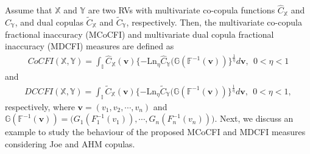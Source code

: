 \documentclass[12pt, a4paper]{article}
\numberwithin{equation}{section}
\begin{document}
Assume that $\mathbb{X}$ and $\mathbb{Y}$ are two RVs with multivariate co-copula functions $\widehat{C}_{\mathbb{X}}$ and $\widehat{C}_{\mathbb{Y}}$, and dual copulas $\widetilde C_{\mathbb{X}}$ and $\widetilde C_{\mathbb{Y}}$, respectively. Then, the multivariate co-copula fractional inaccuracy (MCoCFI) and multivariate dual copula fractional inaccuracy (MDCFI) measures are defined as
\begin{align}\label{eq5.1}
CoCFI(\mathbb{X},\mathbb{Y})=\int_{\mathbb I}\widehat{C}_\mathbb{X}(\textbf{v})\{-\mathrm{Ln}_\eta\widehat{C}_\mathbb{Y}\big(\mathbb{G}(\mathbb{F}^{-1}(\textbf{v}))\big\}^{\frac{1}{\eta}}d\textbf{v},~~0<\eta<1
\end{align}
and 
\begin{align}\label{eq5.2}
DCCFI(\mathbb{X},\mathbb{Y})=\int_{\mathbb I}\widetilde C_\mathbb{X}(\textbf{v})\{-\mathrm{Ln}_\eta\widetilde C_\mathbb{Y}\big(\mathbb{G}(\mathbb{F}^{-1}(\textbf{v}))\big\}^{\frac{1}{\eta}}d\textbf{v},~~0<\eta<1,
\end{align}
 respectively, where $\textbf{v}=(v_1,v_2,\cdots,v_n)$ and $\mathbb{G}(\mathbb{F}^{-1}(\textbf{v}))=\big(G_1(F_1^{-1}(v_1)),\cdots,G_n(F_n^{-1}(v_n))\big)$.
Next, we discuss an example to study the behaviour of the  proposed MCoCFI and MDCFI measures considering Joe and AHM copulas.
\end{document}
